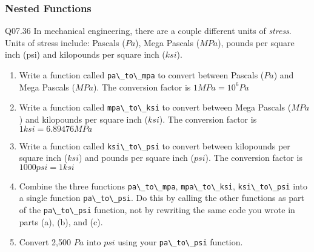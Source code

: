\documentclass{book}
\newenvironment{problems}{}{}  %
\newcommand{\passthrough}[1]{#1}
\begin{document}
    
        \begin{problems}
        \hypertarget{nested-functions}{%
\subsubsection{Nested Functions}\label{nested-functions}}

Q07.36 In mechanical engineering, there are a couple different units of
\emph{stress}. Units of stress include: Pascals (\(Pa\)), Mega Pascals
(\(MPa\)), pounds per square inch (psi) and kilopounds per square inch
(\(ksi\)).

\begin{enumerate}
\def\labelenumi{(\alph{enumi})}
\item
  Write a function called \passthrough{\lstinline!pa\_to\_mpa!} to
  convert between Pascals (\(Pa\)) and Mega Pascals (\(MPa\)). The
  conversion factor is \(1 MPa = 10^6 Pa\)
\item
  Write a function called \passthrough{\lstinline!mpa\_to\_ksi!} to
  convert between Mega Pascals (\(MPa\)) and kilopounds per square inch
  (\(ksi\)). The conversion factor is \(1 ksi = 6.89476 MPa\)
\item
  Write a function called \passthrough{\lstinline!ksi\_to\_psi!} to
  convert between kilopounds per square inch (\(ksi\)) and pounds per
  square inch (\(psi\)). The conversion factor is \(1000 psi = 1 ksi\)
\item
  Combine the three functions \passthrough{\lstinline!pa\_to\_mpa!},
  \passthrough{\lstinline!mpa\_to\_ksi!},
  \passthrough{\lstinline!ksi\_to\_psi!} into a single function
  \passthrough{\lstinline!pa\_to\_psi!}. Do this by calling the other
  functions as part of the \passthrough{\lstinline!pa\_to\_psi!}
  function, not by rewriting the same code you wrote in parts (a), (b),
  and (c).
\item
  Convert 2,500 \(Pa\) into \(psi\) using your
  \passthrough{\lstinline!pa\_to\_psi!} function.
\end{enumerate}
        \end{problems}

    
\end{document}

